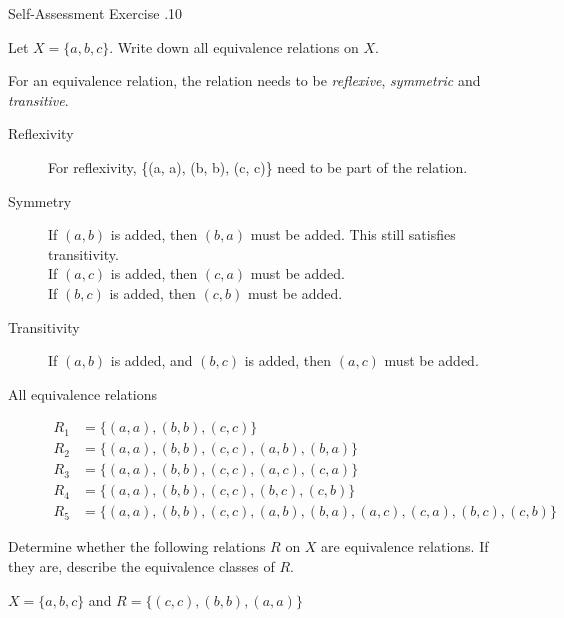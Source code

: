 \documentclass[\main/notes.tex]{subfiles}
\begin{document}
				\begin{exercise}{Self-Assessment Exercise \thechapter.10}
					\begin{questions}
						\item Let $X = \{a, b, c\}$. Write down all equivalence relations on $X$.\\
							\begin{answer}
								For an equivalence relation, the relation needs to be \emph{reflexive}, \emph{symmetric} and \emph{transitive}.
								\begin{description}
									\item[Reflexivity] For reflexivity, \{(a, a), (b, b), (c, c)\} need to be part of the relation.
									\item[Symmetry] If $(a, b)$ is added, then $(b, a)$ must be added. This still satisfies transitivity.\\
									If $(a, c)$ is added, then $(c, a)$ must be added.\\
									If $(b, c)$ is added, then $(c, b)$ must be added.
									\item[Transitivity] If $(a, b)$ is added, and $(b, c)$ is added, then $(a, c)$ must be added.
									\item[All equivalence relations]
										\begin{align*}
											R_{1} &= \bigl\{(a, a), (b, b), (c, c)\bigr\}\\
											R_{2} &= \bigl\{(a, a), (b, b), (c, c), (a, b), (b, a)\bigr\}\\
											R_{3} &= \bigl\{(a, a), (b, b), (c, c), (a, c), (c, a)\bigr\}\\
											R_{4} &= \bigl\{(a, a), (b, b), (c, c), (b, c), (c, b)\bigr\}\\
											R_{5} &= \bigl\{(a, a), (b, b), (c, c), (a, b), (b, a), (a, c), (c, a), (b, c), (c, b)\bigr\}
										\end{align*} 
								\end{description}
							\end{answer}
						\item Determine whether the following relations $R$ on $X$ are equivalence relations. If they are, describe the equivalence classes of $R$.
							\begin{questions}
								\item $X = \{a, b, c\}$ and $R = \bigl\{(c, c), (b, b), (a, a)\bigr\}$
									\begin{answer}
										\begin{description}

\end{description}
\end{answer}
\end{questions}
\end{questions}
\end{exercise}
\end{document}
